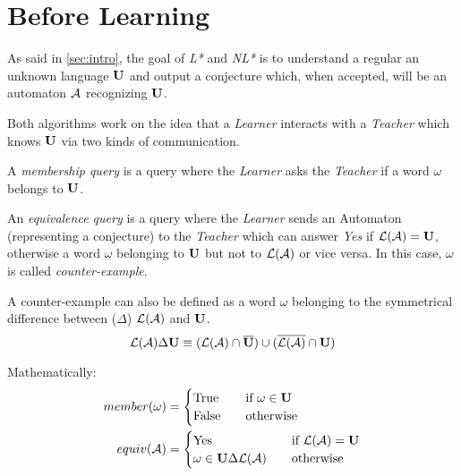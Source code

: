 \section{Before Learning}
As said in \cref{sec:intro}, the goal of \textit{L*} and \textit{NL*} is to understand a regular an unknown language $\mathbf{U}$ and output a conjecture which, when accepted, will be an automaton $\mathcal{A}$ recognizing $\mathbf{U}$.

Both algorithms work on the idea that a \textit{Learner} interacts with a \textit{Teacher} which knows $\mathbf{U}$ via two kinds of communication.

\begin{definition}
  A \textit{membership query} is a query where the \textit{Learner} asks the \textit{Teacher} if a word $\omega$ belongs to $\mathbf{U}$.
\end{definition}

\begin{definition}
  An \textit{equivalence query} is a query where the \textit{Learner} sends an Automaton (representing a conjecture) to the \textit{Teacher} which can answer \textit{Yes} if $\mathcal{L}(\mathcal{A}) = \mathbf{U}$, otherwise a word $\omega$ belonging to $\mathbf{U}$ but not to $\mathcal{L}(\mathcal{A})$ or vice versa. In this case, $\omega$ is called \textit{counter-example}.
\end{definition}

A counter-example can also be defined as a word $\omega$ belonging to the symmetrical difference between ($\Delta$) $\mathcal{L}(\mathcal{A})$ and $\mathbf{U}$.
\[\mathcal{L}(\mathcal{A}) \Delta \mathbf{U} \equiv (\mathcal{L}(\mathcal{A}) \cap \overline{\mathbf{U}}) \cup (\overline{\mathcal{L}(\mathcal{A})} \cap \mathbf{U})\]

Mathematically:
\begin{equation}
  \begin{aligned}
    \label{eq:interactions}
    member(\omega) & =
    \begin{cases}
      \text{True}  & \quad \text{if } \omega \in \mathbf{U} \\
      \text{False} & \quad \text{otherwise}
    \end{cases}
    \\
    equiv(\mathcal{A})      & =
    \begin{cases}
      \text{Yes}               & \quad \text{if } \mathcal{L}(\mathcal{A}) = \mathbf{U} \\
      \omega \in \mathbf{U} \Delta \mathcal{L}(\mathcal{A}) & \quad \text{otherwise}
    \end{cases}
  \end{aligned}
\end{equation}